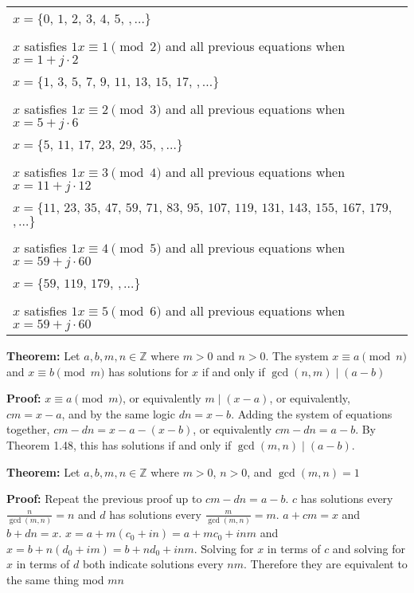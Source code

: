 \begin{tabular}[t]{p{7in}}
\(x = \{\)\(0\), \(1\), \(2\), \(3\), \(4\), \(5\), \(, \dots\}\) \\
\\ \(x\) satisfies \(1 x \equiv 1 \pmod {2}\) and all previous equations
when \(x = 1 + j \cdot 2\) \\
\(x = \{\)\(1\), \(3\), \(5\), \(7\), \(9\), \(11\), \(13\), \(15\), \(17\), \(, \dots\}\) \\
\\ \(x\) satisfies \(1 x \equiv 2 \pmod {3}\) and all previous equations
when \(x = 5 + j \cdot 6\) \\
\(x = \{\)\(5\), \(11\), \(17\), \(23\), \(29\), \(35\), \(, \dots\}\) \\
\\ \(x\) satisfies \(1 x \equiv 3 \pmod {4}\) and all previous equations
when \(x = 11 + j \cdot 12\) \\
\(x = \{\)\(11\), \(23\), \(35\), \(47\), \(59\), \(71\), \(83\), \(95\), \(107\), \(119\), \(131\), \(143\), \(155\), \(167\), \(179\), \(, \dots\}\) \\
\\ \(x\) satisfies \(1 x \equiv 4 \pmod {5}\) and all previous equations
when \(x = 59 + j \cdot 60\) \\
\(x = \{\)\(59\), \(119\), \(179\), \(, \dots\}\) \\
\\ \(x\) satisfies \(1 x \equiv 5 \pmod {6}\) and all previous equations
when \(x = 59 + j \cdot 60\) \\
\end{tabular}

\item \textbf{Theorem:} Let \(a, b, m, n \in \mathbb Z\) where \(m > 0\) and \(n > 0\). The system \(x \equiv a \pmod n\) and \(x \equiv b \pmod m\) has solutions for \(x\) if and only if \(\gcd(n, m) \mid (a - b)\)

\textbf{Proof:} \(x \equiv a \pmod m\), or equivalently \(m \mid (x-a)\), or equivalently, \(cm = x - a\), and by the same logic \(dn = x - b\). Adding the system of equations together, \(cm - dn = x - a - (x - b)\), or equivalently \(cm - dn = a - b\). By Theorem 1.48, this has solutions if and only if \(\gcd(m, n) \mid (a - b)\).

\item \textbf{Theorem:} Let \(a, b, m, n \in \mathbb Z\) where \(m > 0\), \(n > 0\), and \(\gcd(m, n) = 1\)

\textbf{Proof:} Repeat the previous proof up to \(cm - dn = a - b\).  \(c\) has solutions every \(\frac{n}{\gcd(m, n)} = n\) and \(d\) has solutions every \(\frac{m}{\gcd(m, n)} = m\). \(a + cm = x\) and \(b + dn = x\). \(x = a + m(c_0 + in) = a + m c_0 + inm\) and \(x = b + n(d_0 + im) = b + nd_0 + inm\). Solving for \(x\) in terms of \(c\) and solving for \(x\) in terms of \(d\) both indicate solutions every \(nm\). Therefore they are equivalent to the same thing mod \(mn\)


